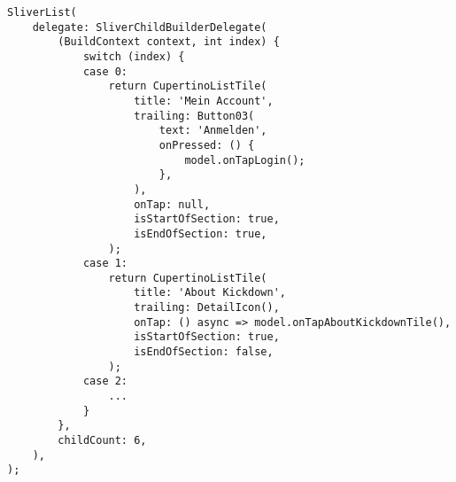\begin{minipage}{\linewidth}
    \begin{lstlisting}[caption={Simplified Flutter More View Implementation},label={lst:fluttter_more_view_implementation}]
SliverList(
    delegate: SliverChildBuilderDelegate(
        (BuildContext context, int index) {
            switch (index) {
            case 0:
                return CupertinoListTile(
                    title: 'Mein Account',
                    trailing: Button03(
                        text: 'Anmelden',
                        onPressed: () {
                            model.onTapLogin();
                        },
                    ),
                    onTap: null,
                    isStartOfSection: true,
                    isEndOfSection: true,
                );
            case 1:
                return CupertinoListTile(
                    title: 'About Kickdown',
                    trailing: DetailIcon(),
                    onTap: () async => model.onTapAboutKickdownTile(),
                    isStartOfSection: true,
                    isEndOfSection: false,
                );
            case 2:
                ...
            }
        },
        childCount: 6,
    ),
);
    \end{lstlisting}
\end{minipage}